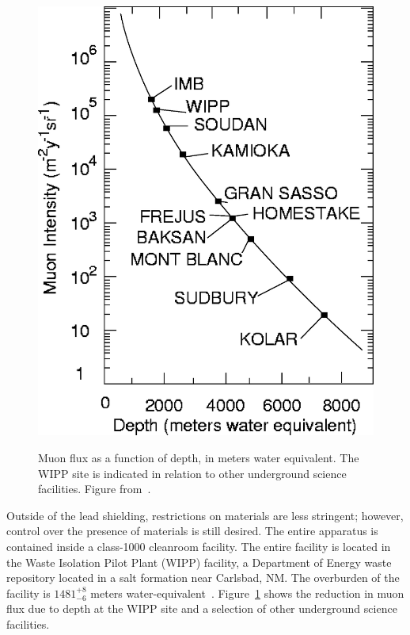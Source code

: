 \begin{figure}
\begin{center}
\includegraphics[keepaspectratio=true,width=\textwidth]{muonflux.eps}
\end{center}
\renewcommand{\baselinestretch}{1}
\small\normalsize
\begin{quote}
\caption{Muon flux as a function of depth, in meters water equivalent.  The WIPP site is indicated in relation to other underground science facilities.  Figure from~\cite{Esch2005516}.}
\label{fig:MuonFluxVsDepth}
\end{quote}
\end{figure}
\renewcommand{\baselinestretch}{2}
\small\normalsize

Outside of the lead shielding, restrictions on materials are less stringent; however, control over the presence of materials is still desired.  The entire apparatus is contained inside a class-1000 cleanroom facility.  The entire facility is located in the Waste Isolation Pilot Plant (WIPP) facility, a Department of Energy waste repository located in a salt formation near Carlsbad, NM.  The overburden of the facility is $1481^{+8}_{-6}$ meters water-equivalent~\cite{ThesisSteve}.  Figure~\ref{fig:MuonFluxVsDepth} shows the reduction in muon flux due to depth at the WIPP site and a selection of other underground science facilities.

